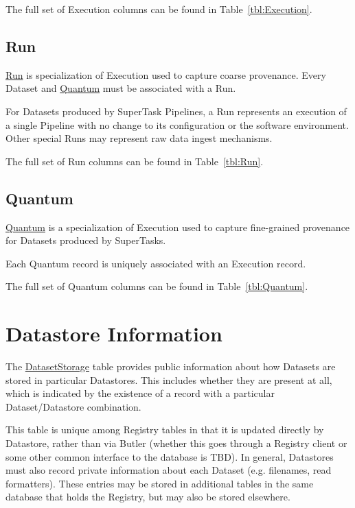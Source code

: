 \documentclass[DM,toc]{lsstdoc}
\newcommand{\tblref}[1]{\hyperref[tbl:#1]{#1}}
\newcommand{\coltable}[1]{
    \begin{table}[!htb]
        {\footnotesize
        }
        \caption{#1 Columns}
        \label{tbl:#1}
    \end{table}
}
\begin{document}
The full set of Execution columns can be found in Table~\ref{tbl:Execution}.

\coltable{Execution}

\subsection{Run}
\label{sec:run}

\tblref{Run} is specialization of Execution used to capture coarse provenance.
Every Dataset and \hyperref[sec:quantum]{Quantum} must be associated with a Run.

For Datasets produced by SuperTask Pipelines, a Run represents an execution of a single Pipeline with no change to its configuration or the software environment.
Other special Runs may represent raw data ingest mechanisms.

The full set of Run columns can be found in Table~\ref{tbl:Run}.

\coltable{Run}

\subsection{Quantum}
\label{sec:quantum}

\tblref{Quantum} is a specialization of Execution used to capture fine-grained provenance for Datasets produced by SuperTasks.

Each Quantum record is uniquely associated with an Execution record.

The full set of Quantum columns can be found in Table~\ref{tbl:Quantum}.

\coltable{Quantum}

\section{Datastore Information}
\label{sec:datastore-information}

The \tblref{DatasetStorage} table provides public information about how Datasets are stored in particular Datastores.  This includes whether they are present at all, which is indicated by the existence of a record with a particular Dataset/Datastore combination.

\coltable{DatasetStorage}

This table is unique among Registry tables in that it is updated directly by Datastore, rather than via Butler (whether this goes through a Registry client or some other common interface to the database is TBD).
In general, Datastores must also record private information about each Dataset (e.g. filenames, read formatters).
These entries may be stored in additional tables in the same database that holds the Registry, but may also be stored elsewhere.
\end{document}
